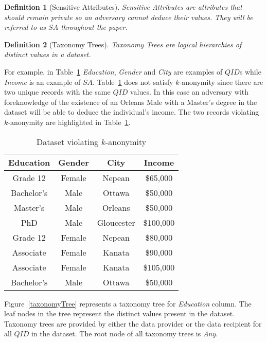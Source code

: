 \documentclass[11pt]{article}       %
\newtheorem{definition}{Definition}
\begin{document}
\begin{definition}[Sensitive Attributes] 
Sensitive Attributes are attributes that should remain private so an adversary cannot deduce their values. They will be referred to as $SA$ throughout the paper.
\end{definition}

\begin{definition}[Taxonomy Trees]
Taxonomy Trees are logical hierarchies of distinct values in a dataset.
\end{definition}

For example, in Table~\ref{table1} \emph{Education}, \emph{Gender} and \emph{City} are examples of $QID$s while \emph{Income} is an example of $SA$. Table~\ref{table1} does not satisfy $k$-anonymity since there are two unique records with the same $QID$ values. In this case an adversary with foreknowledge of the existence of an Orleans Male with a Master's degree in the dataset will be able to deduce the individual's income. The two records violating $k$-anonymity are highlighted in Table~\ref{table1}.

\begin{table}[htp]
\begin{center}
\begin{tabular}{|c|c|c|c|}
\hline
Education & Gender & City & Income \\
\hline
Grade 12 & Female & Nepean & \$65,000 \\
Bachelor's & Male & Ottawa & \$50,000 \\
\rowcolor [HTML]{EAECEE} Master’s & Male & Orleans & \$50,000 \\
\rowcolor [HTML]{EAECEE} PhD & Male & Gloucester & \$100,000 \\
Grade 12 & Female & Nepean & \$80,000 \\
Associate & Female & Kanata & \$90,000 \\
Associate & Female & Kanata & \$105,000 \\
Bachelor's & Male & Ottawa & \$50,000 \\
\hline
\end{tabular}
\end{center}
\caption{Dataset violating $k$-anonymity}
\label{table1}
\end{table}

Figure~\ref{taxonomyTree} represents a taxonomy tree for \emph{Education} column. The leaf nodes in the tree represent the distinct values present in the dataset. Taxonomy trees are provided by either the data provider or the data recipient for all $QID$ in the dataset. The root node of all taxonomy trees is \emph{Any}.
\end{document}
